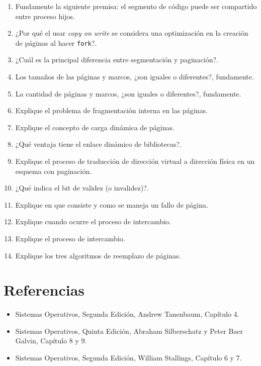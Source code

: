 \begin{enumerate}
	\item Fundamente la siguiente premisa: el segmento de código puede ser compartido entre proceso hijos.
	\item ¿Por qué el usar \textit{copy on write} se considera una optimización en la creación de páginas al hacer \texttt{fork}?.
	\item ¿Cuál es la principal diferencia entre segmentación y paginación?.
	\item Los tamaños de las páginas y marcos, ¿son iguales o diferentes?, fundamente.
	\item La cantidad de páginas y marcos, ¿son iguales o diferentes?, fundamente.
	\item Explique el problema de fragmentación interna en las páginas.
	\item Explique el concepto de carga dinámica de páginas.
	\item ¿Qué ventaja tiene el enlace dinámico de bibliotecas?.
	\item Explique el proceso de traducción de dirección virtual a dirección física en un esquema con paginación.
	\item ¿Qué indica el bit de validez (o invalidez)?.
	\item Explique en que consiste y como se maneja un fallo de página.
	\item Explique cuando ocurre el proceso de intercambio.
	\item Explique el proceso de intercambio.
	\item Explique los tres algoritmos de reemplazo de páginas.
\end{enumerate}

\section{Referencias}
\begin{itemize}
	\item Sistemas Operativos, Segunda Edición, Andrew Tanenbaum, Capítulo 4.
	\item Sistemas Operativos, Quinta Edición, Abraham Silberschatz y Peter Baer Galvin, Capítulo 8 y 9.
	\item Sistemas Operativos, Segunda Edición, William Stallings, Capítulo 6 y 7.
\end{itemize}
